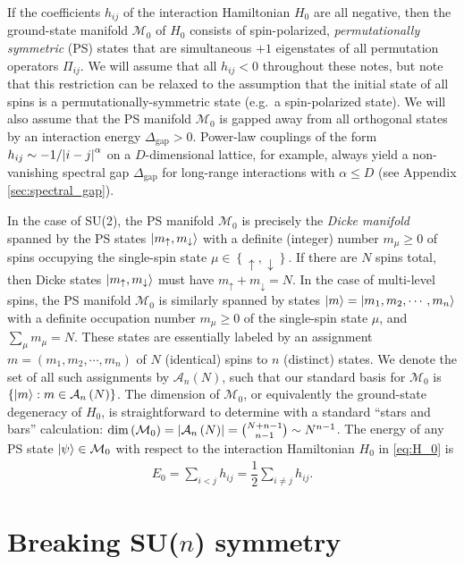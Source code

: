 \documentclass[nofootinbib,notitlepage,11pt]{revtex4-2}
\renewcommand{\t}{\text} %
\newcommand{\f}[2]{\dfrac{#1}{#2}} %
\newcommand{\p}[1]{\left(#1\right)} %
\renewcommand{\set}[1]{\left\{#1\right\}} %
\newcommand{\1}{\mathds{1}}
\newcommand{\up}{\uparrow}
\newcommand{\dn}{\downarrow}
\newcommand{\A}{\mathcal{A}}
\newcommand{\M}{\mathcal{M}}
\begin{document}
If the coefficients $h_{ij}$ of the interaction Hamiltonian $H_0$ are
all negative, then the ground-state manifold $\M_0$ of $H_0$ consists
of spin-polarized, {\it permutationally symmetric} (PS) states that
are simultaneous $+1$ eigenstates of all permutation operators
$\Pi_{ij}$.  We will assume that all $h_{ij}<0$ throughout these
notes, but note that this restriction can be relaxed to the assumption
that the initial state of all spins is a permutationally-symmetric
state (e.g.~a spin-polarized state).  We will also assume that the PS
manifold $\M_0$ is gapped away from all orthogonal states by an
interaction energy $\Delta_{\t{gap}}>0$.  Power-law couplings of the
form $h_{ij}\sim-1/\abs{i-j}^\alpha$ on a $D$-dimensional lattice, for
example, always yield a non-vanishing spectral gap $\Delta_{\t{gap}}$
for long-range interactions with $\alpha\le D$ (see Appendix
\ref{sec:spectral_gap}).

In the case of SU(2), the PS manifold $\M_0$ is precisely the {\it
  Dicke manifold} spanned by the PS states $\ket{m_\up,m_\dn}$ with a
definite (integer) number $m_\mu\ge0$ of spins occupying the
single-spin state $\mu\in\set{\up,\dn}$.  If there are $N$ spins
total, then Dicke states $\ket{m_\up,m_\dn}$ must have
$m_\up+m_\dn=N$.  In the case of multi-level spins, the PS manifold
$\M_0$ is similarly spanned by states
$\ket{m}=\ket{m_1,m_2,\cdots,m_n}$ with a definite occupation number
$m_\mu\ge0$ of the single-spin state $\mu$, and $\sum_\mu m_\mu=N$.
These states are essentially labeled by an assignment
$m=\p{m_1,m_2,\cdots,m_n}$ of $N$ (identical) spins to $n$ (distinct)
states.  We denote the set of all such assignments by $\A_n\p{N}$,
such that our standard basis for $\M_0$ is
$\set{\ket{m}:m\in\A_n\p{N}}$.  The dimension of $\M_0$, or
equivalently the ground-state degeneracy of $H_0$, is straightforward
to determine with a standard ``stars and bars'' calculation:
$\dim\p{\M_0}=\abs{\A_n\p{N}} = {N+n-1 \choose n-1} \sim N^{n-1}$.
The energy of any PS state $\ket\psi\in\M_0$ with respect to the
interaction Hamiltonian $H_0$ in \eqref{eq:H_0} is
\begin{align}
  E_0 = \sum_{i<j} h_{ij} = \f12 \sum_{i\ne j} h_{ij}.
\end{align}

\section{Breaking SU($n$) symmetry}
\label{sec:breaking_sun}
\end{document}
